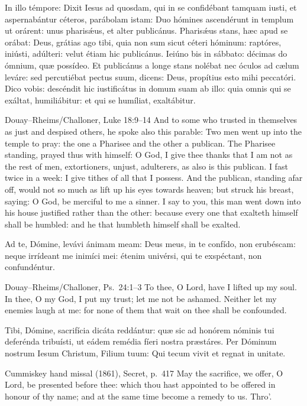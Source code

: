 In illo témpore: Dixit Iesus ad quosdam, qui in se confidébant tamquam iusti,
et aspernabántur céteros, parábolam istam: Duo hómines ascendérunt in templum
ut orárent: unus pharis\'{\ae}us, et alter publicánus. Pharis\'{\ae}us stans, hæc apud
se orábat: Deus, grátias ago tibi, quia non sum sicut céteri hóminum:
raptóres, iniústi, adúlteri: velut étiam hic publicánus. Ieiúno bis in sábbato:
décimas do ómnium, quæ possídeo. Et publicánus a longe stans nolébat nec
óculos ad cælum leváre: sed percutiébat pectus suum, dicens: Deus, propítius
esto mihi peccatóri. Dico vobis: descéndit hic iustificátus in domum suam ab
illo: quia omnis qui se exáltat, humiliábitur: et qui se humíliat, exaltábitur.
\finishfulltextelement
\begin{fulltextenglish}{Douay--Rheims/Challoner, Luke 18:9--14}
And to some who trusted in themselves as just and despised others, he spoke
also this parable: Two men went up into the temple to pray: the one a Pharisee
and the other a publican. The Pharisee standing, prayed thus with himself: O
God, I give thee thanks that I am not as the rest of men, extortioners, unjust,
adulterers, as also is this publican. I fast twice in a week: I give tithes of
all that I possess. And the publican, standing afar off, would not so much as
lift up his eyes towards heaven; but struck his breast, saying: O God, be
merciful to me a sinner. I say to you, this man went down into his house
justified rather than the other: because every one that exalteth himself shall
be humbled: and he that humbleth himself shall be exalted.
\end{fulltextenglish}

Ad te, Dómine, levávi ánimam meam: Deus meus, in te confído, non erubéscam:
neque irrídeant me inimíci mei: étenim univérsi, qui te exspéctant, non
confundéntur.
\finishfulltextelement
\begin{fulltextenglish}{Douay--Rheims/Challoner, Ps.~24:1--3}
To thee, O Lord, have I lifted up my soul. In thee, O my God, I put my trust;
let me not be ashamed. Neither let my enemies laugh at me: for none of them
that wait on thee shall be confounded.
\end{fulltextenglish}

Tibi, Dómine, sacrifícia dicáta reddántur: quæ sic ad honórem nóminis tui
deferénda tribuísti, ut eádem remédia fíeri nostra præstáres. Per Dóminum
nostrum Iesum Christum, Filium tuum: Qui tecum vivit et regnat in unitate.
\finishfulltextelement
\begin{fulltextenglish}{Cummiskey hand missal (1861), Secret, p.~417}
May the sacrifice, we offer, O Lord, be presented before thee: which thou hast
appointed to be offered in honour of thy name; and at the same time become a
remedy to us. Thro'.
\end{fulltextenglish}

